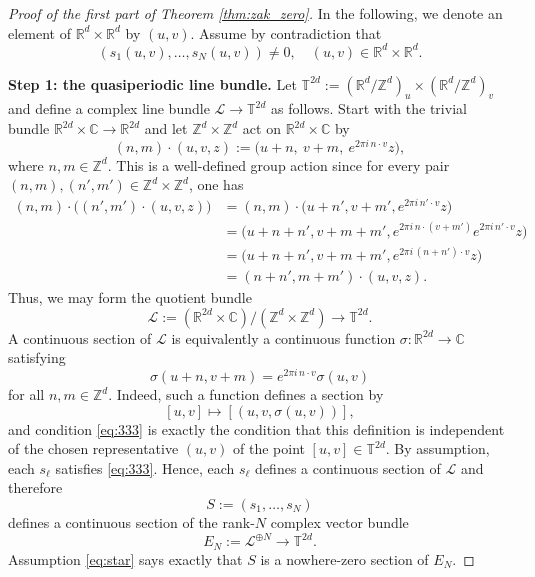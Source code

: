 \documentclass[10pt,a4paper]{amsart}
\def\R{{\mathbb R}}
\newcommand{\Rd}{{\R^d}}
\begin{document}
\begin{proof}[Proof of the first part of Theorem \ref{thm:zak_zero}]    

In the following, we denote an element of $\Rd \times \Rd$ by $(u,v)$. Assume by contradiction that
\begin{equation}\label{eq:star}
    (s_1(u,v),\dots,s_N(u,v))\neq 0, \quad (u,v)\in\mathbb R^d\times\mathbb R^d.
\end{equation}

\smallskip
\noindent\textbf{Step 1: the quasiperiodic line bundle.}
Let
$
\mathbb T^{2d}
:=
(\mathbb R^d/\mathbb Z^d)_u\times(\mathbb R^d/\mathbb Z^d)_v
$
and define a complex line bundle
$
\mathcal L \to \mathbb T^{2d}
$
as follows. Start with the trivial bundle
$
\mathbb R^{2d}\times \mathbb C\to \mathbb R^{2d}
$
and let $\mathbb Z^d\times\mathbb Z^d$ act on $\mathbb R^{2d}\times \mathbb C$ by
$$
(n,m)\cdot (u,v,z)
:=
\bigl(u+n,\ v+m,\ e^{2\pi i\,n\cdot v}z\bigr),
$$
where $n,m\in\mathbb Z^d$.
This is a well-defined group action since for every pair $(n,m),(n',m')\in
\mathbb Z^d\times\mathbb Z^d$, one has
$$
\begin{aligned}
(n,m)\cdot\bigl((n',m')\cdot(u,v,z)\bigr)
&=
(n,m)\cdot
\bigl(u+n',v+m',e^{2\pi i\,n'\cdot v}z\bigr)  \\
&=
\bigl(u+n+n',v+m+m',
e^{2\pi i\,n\cdot(v+m')}e^{2\pi i\,n'\cdot v}z\bigr)  \\
&=
\bigl(u+n+n',v+m+m',
e^{2\pi i\,(n+n')\cdot v}z\bigr) \\
&=
(n+n',m+m')\cdot(u,v,z).
\end{aligned}
$$
Thus, we may form the quotient bundle
$$
\mathcal L
:=
(\mathbb R^{2d}\times\mathbb C)/(\mathbb Z^d\times\mathbb Z^d)
\to
\mathbb T^{2d}.
$$
A continuous section of $\mathcal L$ is equivalently a continuous function
$
\sigma:\mathbb R^{2d}\to\mathbb C
$
satisfying
\begin{equation}\label{eq:333}
    \sigma(u+n,v+m)
=
e^{2\pi i\,n\cdot v}\sigma(u,v)
\end{equation}
for all $n,m\in\mathbb Z^d$.
Indeed, such a function defines a section by
$$
[u,v]\longmapsto [(u,v,\sigma(u,v))],
$$
and condition \eqref{eq:333} is exactly the condition that this definition is independent of
the chosen representative $(u,v)$ of the point $[u,v]\in\mathbb T^{2d}$.
By assumption, each $s_\ell$ satisfies \eqref{eq:333}. Hence, each $s_\ell$ defines a continuous
section of $\mathcal L$ and therefore
$$
S:=(s_1,\dots,s_N)
$$
defines a continuous section of the rank-$N$ complex vector bundle
$$
E_N:=\mathcal L^{\oplus N} \to \mathbb T^{2d}.
$$
Assumption \eqref{eq:star} says exactly that $S$ is a nowhere-zero section of
$E_N$.


\end{proof}
\end{document}
